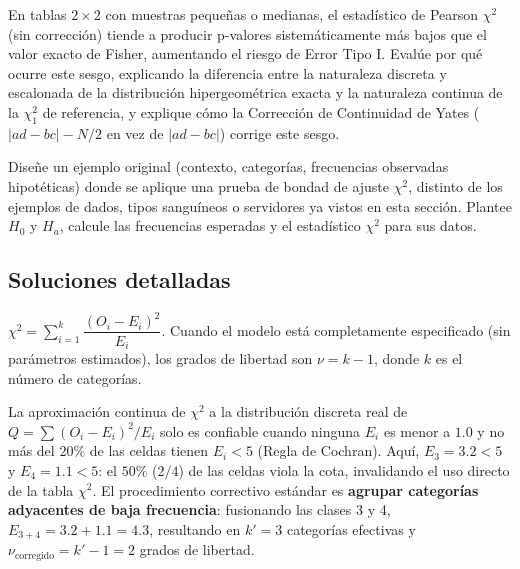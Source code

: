 \begin{problema}
	\label{prob:f622374}
	En tablas $2\times2$ con muestras pequeñas o medianas, el estadístico de Pearson $\chi^2$ (sin corrección) tiende a producir p-valores sistemáticamente más bajos que el valor exacto de Fisher, aumentando el riesgo de Error Tipo I. Evalúe por qué ocurre este sesgo, explicando la diferencia entre la naturaleza discreta y escalonada de la distribución hipergeométrica exacta y la naturaleza continua de la $\chi^2_1$ de referencia, y explique cómo la Corrección de Continuidad de Yates ($|ad-bc|-N/2$ en vez de $|ad-bc|$) corrige este sesgo.
\end{problema}

\begin{problema}
	\label{prob:369a6a1}
	Diseñe un ejemplo original (contexto, categorías, frecuencias observadas hipotéticas) donde se aplique una prueba de bondad de ajuste $\chi^2$, distinto de los ejemplos de dados, tipos sanguíneos o servidores ya vistos en esta sección. Plantee $H_0$ y $H_a$, calcule las frecuencias esperadas y el estadístico $\chi^2$ para sus datos.
\end{problema}

\subsection*{Soluciones detalladas}

\begin{solproblema}[prob:3f1ec07]
	$\chi^2 = \sum_{i=1}^k \dfrac{(O_i-E_i)^2}{E_i}$. Cuando el modelo está completamente especificado (sin parámetros estimados), los grados de libertad son $\nu=k-1$, donde $k$ es el número de categorías.
\end{solproblema}

\begin{solproblema}[prob:d4859df]
	La aproximación continua de $\chi^2$ a la distribución discreta real de $Q=\sum(O_i-E_i)^2/E_i$ solo es confiable cuando ninguna $E_i$ es menor a $1.0$ y no más del $20\%$ de las celdas tienen $E_i<5$ (Regla de Cochran). Aquí, $E_3=3.2<5$ y $E_4=1.1<5$: el $50\%$ ($2/4$) de las celdas viola la cota, invalidando el uso directo de la tabla $\chi^2$. El procedimiento correctivo estándar es \textbf{agrupar categorías adyacentes de baja frecuencia}: fusionando las clases 3 y 4, $E_{3+4}=3.2+1.1=4.3$, resultando en $k'=3$ categorías efectivas y $\nu_{\text{corregido}}=k'-1=2$ grados de libertad.
\end{solproblema}

